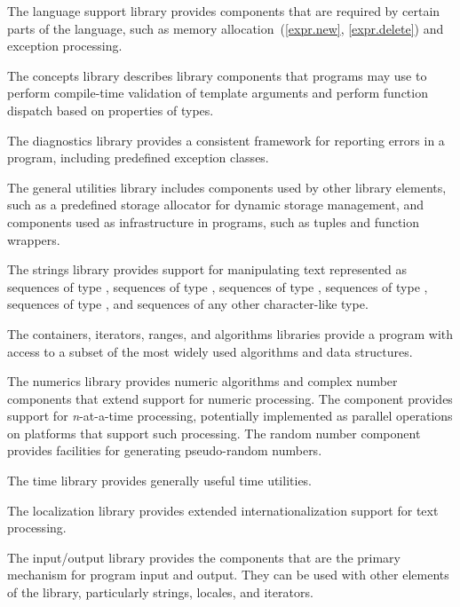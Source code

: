 \pnum
The language support library provides components that are
required by certain parts of the \Cpp{} language, such as memory allocation~(\ref{expr.new},
\ref{expr.delete}) and exception processing.

\pnum
The concepts library describes library components that \Cpp{}
programs may use to perform compile-time validation of template arguments and
perform function dispatch based on properties of types.

\pnum
The diagnostics library provides a consistent framework for
reporting errors in a \Cpp{} program, including predefined exception classes.

\pnum
The general utilities library includes components used
by other library elements, such as a predefined storage allocator for dynamic
storage management, and components used
as infrastructure
in \Cpp{} programs,
such as tuples and function wrappers.

\pnum
The strings library provides support for manipulating text represented
as sequences of type ,
sequences of type ,
sequences of type ,
sequences of type ,
sequences of type ,
and sequences of any other character-like type.

\pnum
The containers, iterators, ranges,
and algorithms libraries provide a \Cpp{} program with access
to a subset of the most widely used algorithms and data structures.

\pnum
The numerics library provides
numeric algorithms and complex number components that extend support for numeric processing.
The
component provides support for
\textit{n}-at-a-time
processing,
potentially implemented as parallel operations on platforms that support such processing.
The random number component provides facilities for generating pseudo-random numbers.

\pnum
The time library provides
generally useful time utilities.

\pnum
The localization library provides extended internationalization
support for text processing.

\pnum
The input/output library provides the
components that are the primary mechanism for \Cpp{} program input and output.
They can be used with other elements of the library, particularly
strings, locales, and iterators.

